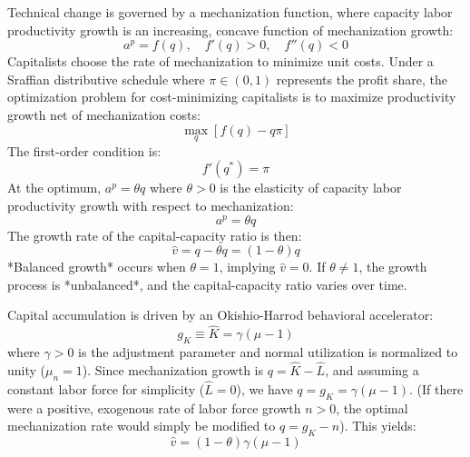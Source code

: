 \documentclass[12pt, a4paper]{article}
\theoremstyle{definition}
\theoremstyle{remark}
\begin{document}
Technical change is governed by a mechanization function, where capacity labor productivity growth is an increasing, concave function of mechanization growth:
\begin{equation} \label{eq:tech_relation}
    a^p = f(q), \quad f'(q) > 0, \quad f''(q) < 0
\end{equation}
Capitalists choose the rate of mechanization to minimize unit costs. Under a Sraffian distributive schedule where $\pi \in (0, 1)$ represents the profit share, the optimization problem for cost-minimizing capitalists is to maximize productivity growth net of mechanization costs:
\begin{equation} \label{eq:capitalist_opt}
    \max_{q} \left[ f(q) - q \pi \right]
\end{equation}
The first-order condition is:
\begin{equation} \label{eq:foc}
    f'(q^*) = \pi
\end{equation}
At the optimum, $a^p = \theta q$ where $\theta > 0$ is the elasticity of capacity labor productivity growth with respect to mechanization:
\begin{equation} \label{eq:theta_def}
    a^p = \theta q
\end{equation}
The growth rate of the capital-capacity ratio is then:
\begin{equation} \label{eq:v_growth_theta}
    \hat{v} = q - \theta q = (1 - \theta)q
\end{equation}
*Balanced growth* occurs when $\theta = 1$, implying $\hat{v} = 0$. If $\theta \neq 1$, the growth process is *unbalanced*, and the capital-capacity ratio varies over time.

Capital accumulation is driven by an Okishio-Harrod behavioral accelerator:
\begin{equation} \label{eq:gK_def}
    g_K \equiv \hat{K} = \gamma(\mu - 1)
\end{equation}
where $\gamma > 0$ is the adjustment parameter and normal utilization is normalized to unity ($\mu_n = 1$). Since mechanization growth is $q = \hat{K} - \hat{L}$, and assuming a constant labor force for simplicity ($\hat{L} = 0$), we have $q = g_K = \gamma(\mu - 1)$. (If there were a positive, exogenous rate of labor force growth $n > 0$, the optimal mechanization rate would simply be modified to $q = g_K - n$). This yields:
\begin{equation} \label{eq:v_growth_final}
    \hat{v} = (1 - \theta)\gamma(\mu - 1)
\end{equation}
\end{document}
